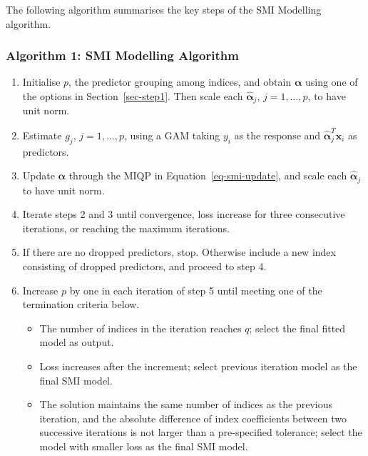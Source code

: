 \documentclass[
  11pt,
  a4paper,
]{article}
\providecommand{\tightlist}{%
  \setlength{\itemsep}{0pt}\setlength{\parskip}{0pt}}\usepackage{longtable,booktabs,array}
\begin{document}
The following algorithm summarises the key steps of the SMI Modelling
algorithm. \newline

\subsubsection*{Algorithm 1: SMI Modelling
Algorithm}\label{algorithm-1-smi-modelling-algorithm}

\begin{enumerate}
\def\labelenumi{\arabic{enumi}.}
\tightlist
\item
  Initialise \(p\), the predictor grouping among indices, and obtain
  \(\bm{\alpha}\) using one of the options in Section~\ref{sec-step1}.
  Then scale each \(\hat{\bm{\alpha}}_{j}\), \(j=1,\dots,p\), to have
  unit norm.
\item
  Estimate \(g_{j}\), \(j=1,\dots,p\), using a GAM taking \(y_{i}\) as
  the response and \(\hat{\bm{\alpha}}_{j}^{T}\bm{x}_{i}\) as
  predictors.
\item
  Update \(\bm{\alpha}\) through the MIQP in
  Equation~\ref{eq-smi-update}, and scale each \(\hat{\bm{\alpha}}_{j}\)
  to have unit norm.
\item
  Iterate steps 2 and 3 until convergence, loss increase for three
  consecutive iterations, or reaching the maximum iterations.
\item
  If there are no dropped predictors, stop. Otherwise include a new
  index consisting of dropped predictors, and proceed to step 4.
\item
  Increase \(p\) by one in each iteration of step 5 until meeting one of
  the termination criteria below.

  \begin{itemize}
  \tightlist
  \item
    The number of indices in the iteration reaches \(q\); select the
    final fitted model as output.
  \item
    Loss increases after the increment; select previous iteration model
    as the final SMI model.
  \item
    The solution maintains the same number of indices as the previous
    iteration, and the absolute difference of index coefficients between
    two successive iterations is not larger than a pre-specified
    tolerance; select the model with smaller loss as the final SMI
    model.
  \end{itemize}
\end{enumerate}
\end{document}
